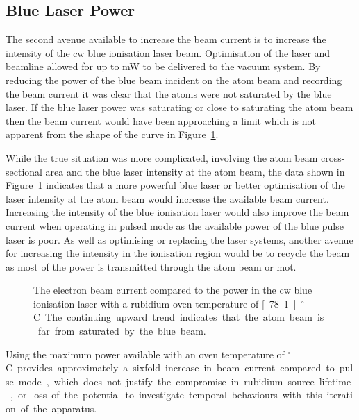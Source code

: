 \subsection{Blue Laser Power}

The second avenue available to increase the beam current is to increase the intensity of the \gls{cw} blue ionisation laser beam.
Optimisation of the laser and beamline allowed for up to \unit[280]{mW} to be delivered to the vacuum system.
By reducing the power of the blue beam incident on the atom beam and recording the beam current it was clear that the atoms were not saturated by the blue laser.
If the blue laser power was saturating or close to saturating the atom beam then the beam current would have been approaching a limit which is not apparent from the shape of the curve in Figure~\ref{figure:blue_power}.

While the true situation was more complicated, involving the atom beam cross-sectional area and the blue laser intensity at the atom beam, the data shown in Figure~\ref{figure:blue_power} indicates that a more powerful blue laser or better optimisation of the laser intensity at the atom beam would increase the available beam current.
Increasing the intensity of the blue ionisation laser would also improve the beam current when operating in pulsed mode as the available power of the blue pulse laser is poor.
As well as optimising or replacing the laser systems, another avenue for increasing the intensity in the ionisation region would be to recycle the beam as most of the power is transmitted through the atom beam or \gls{mot}.

\begin{figure}
    \center
    
    \caption[Beam current and ionisation laser power.]{The electron beam current compared to the power in the \gls{cw} blue ionisation laser with a rubidium oven temperature of \unit[78.1]{$^\circ$C}.
    The continuing upward trend indicates that the atom beam is far from saturated by the blue beam.}
    \label{figure:blue_power}
\end{figure}

Using the maximum power available with an oven temperature of \unit[200]{$^\circ$C} provides approximately a sixfold increase in beam current compared to pulse mode, which does not justify the compromise in rubidium source lifetime, or loss of the potential to investigate temporal behaviours with this iteration of the apparatus.

